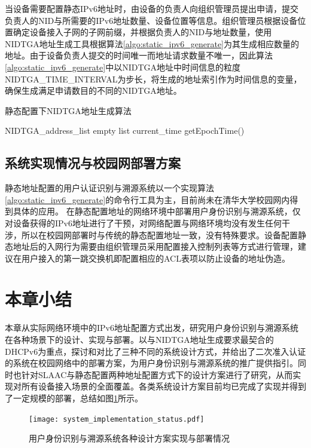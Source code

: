     当设备需要配置静态IPv6地址时，由设备的负责人向组织管理员提出申请，提交负责人的NID与所需要的IPv6地址数量、设备位置等信息。组织管理员根据设备位置确定设备接入子网的子网前缀，并根据负责人的NID与地址数量，使用NIDTGA地址生成工具根据算法\ref{algo:static_ipv6_generate}为其生成相应数量的地址。由于设备负责人提交的时间唯一而地址请求数量不唯一，因此算法\ref{algo:static_ipv6_generate}中以NIDTGA地址中时间信息的粒度NIDTGA\_TIME\_INTERVAL为步长，将生成的地址索引作为时间信息的变量，确保生成满足申请数目的不同的NIDTGA地址。

      \begin{algorithm}
        \caption{静态配置下NIDTGA地址生成算法}
        \label{algo:static_ipv6_generate}
        
        \LinesNumbered

        NIDTGA\_address\_list \gets empty list\;
        current\_time \gets getEpochTime()\;
      \end{algorithm}

    \subsection{系统实现情况与校园网部署方案}
    \label{NIDTGA:manual:deploy}
    静态地址配置的用户认证识别与溯源系统以一个实现算法\ref{algo:static_ipv6_generate}的命令行工具为主，目前尚未在清华大学校园网内得到具体的应用。
    在静态配置地址的网络环境中部署用户身份识别与溯源系统，仅对设备获得的IPv6地址进行了干预，对网络配置与网络环境均没有发生任何干涉，所以在校园网部署时与传统的静态配置地址一致，没有特殊要求。设备配置静态地址后的入网行为需要由组织管理员采用配置接入控制列表等方式进行管理，建议在用户接入的第一跳交换机即配置相应的ACL表项以防止设备的地址伪造。

  \section{本章小结}
  \label{NIDTGA:summary}
  本章从实际网络环境中的IPv6地址配置方式出发，研究用户身份识别与溯源系统在各种场景下的设计、实现与部署。以与NIDTGA地址生成要求最契合的DHCPv6为重点，探讨和对比了三种不同的系统设计方式，并给出了二次准入认证的系统在校园网络中的部署方案，为用户身份识别与溯源系统的推广提供指引。同时也针对SLAAC与静态配置两种地址配置方式下的设计方案进行了研究，从而实现对所有设备接入场景的全面覆盖。各类系统设计方案目前均已完成了实现并得到了一定规模的部署，总结如图\ref{fig:system_implementation_status}所示。

  \begin{figure}[ht]
    \centering
    \texttt{[image: system\_implementation\_status.pdf]}
    \caption{用户身份识别与溯源系统各种设计方案实现与部署情况}
    \label{fig:system_implementation_status}
  \end{figure}
